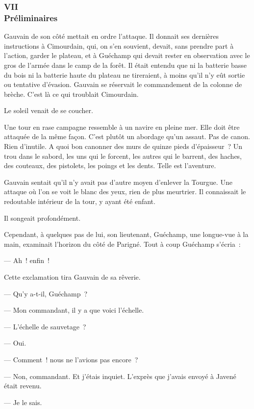 \documentclass[french,twoside]{book} %
\begin{document}
 \subsubsection[{VII. Préliminaires}]{VII \\
Préliminaires}
\label{p3l4c7}
\noindent Gauvain de son côté mettait en ordre l’attaque. Il donnait ses dernières instructions à Cimourdain, qui, on s’en souvient, devait, sans prendre part à l’action, garder le plateau, et à Guéchamp qui devait rester en observation avec le gros de l’armée dans le camp de la forêt. Il était entendu que ni la batterie basse du bois ni la batterie haute du plateau ne tireraient, à moins qu’il n’y eût sortie ou tentative d’évasion. Gauvain se réservait le commandement de la colonne de brèche. C’est là ce qui troublait Cimourdain.\par
Le soleil venait de se coucher.\par
Une tour en rase campagne ressemble à un navire en pleine mer. Elle doit être attaquée de la même façon. C’est plutôt un abordage qu’un assaut. Pas de canon. Rien d’inutile. A quoi bon canonner des murs de quinze pieds d’épaisseur ? Un trou dans le sabord, les uns qui le forcent, les autres qui le barrent, des haches, des couteaux, des pistolets, les poings et les dents. Telle est l’aventure.\par
Gauvain sentait qu’il n’y avait pas d’autre moyen d’enlever la Tourgue. Une attaque où l’on se voit le  blanc des yeux, rien de plus meurtrier. Il connaissait le redoutable intérieur de la tour, y ayant été enfant.\par
Il songeait profondément.\par
Cependant, à quelques pas de lui, son lieutenant, Guéchamp, une longue-vue à la main, examinait l’horizon du côté de Parigné. Tout à coup Guéchamp s’écria :\par
— Ah ! enfin !\par
Cette exclamation tira Gauvain de sa rêverie.\par
— Qu’y a-t-il, Guéchamp ?\par
— Mon commandant, il y a que voici l’échelle.\par
— L’échelle de sauvetage ?\par
— Oui.\par
— Comment ! nous ne l’avions pas encore ?\par
— Non, commandant. Et j’étais inquiet. L’exprès que j’avais envoyé à Javené était revenu.\par
— Je le sais.\par
\end{document}
